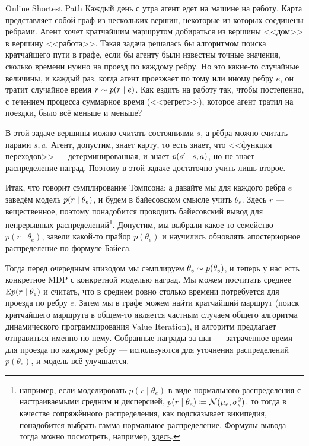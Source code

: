 \begin{exampleBox}[label=ex:onlineshortestpath]{Online Shortest Path}
Каждый день с утра агент едет на машине на работу. Карта представляет собой граф из нескольких вершин, некоторые из которых соединены рёбрами. Агент хочет кратчайшим маршрутом добираться из вершины <<дом>> в вершину <<работа>>. Такая задача решалась бы алгоритмом поиска кратчайшего пути в графе, если бы агенту были известны точные значения, сколько времени нужно на проезд по каждому ребру. Но это какие-то случайные величины, и каждый раз, когда агент проезжает по тому или иному ребру $e$, он тратит случайное время $r \HM \sim p(r \mid e)$. Как ездить на работу так, чтобы постепенно, с течением процесса суммарное время (<<регрет>>), которое агент тратил на поездки, было всё меньше и меньше?

В этой задаче вершины можно считать состояниями $s$, а рёбра можно считать парами $s, a$. Агент, допустим, знает карту, то есть знает, что <<функция переходов>> --- детерминированная, и знает $p(s' \HM \mid s, a)$, но не знает распределение наград. Поэтому в этой задаче достаточно учить лишь второе.

Итак, что говорит сэмплирование Томпсона: а давайте мы для каждого ребра $e$ заведём модель $p(r \HM \mid \theta_e)$, и будем в байесовском смысле учить $\theta_e$. Здесь $r$ --- вещественное, поэтому понадобится проводить байесовский вывод для непрерывных распределений\footnote[*]{например, если моделировать $p(r \mid \theta_e)$ в виде нормального распределения с настраиваемыми средним и дисперсией, $p(r \mid \theta_e) \HM \coloneqq \N(\mu_e, \sigma^2_e)$, то тогда в качестве сопряжённого распределения, как подсказывает  \href{https://en.wikipedia.org/wiki/Conjugate_prior\#When_likelihood_function_is_a_continuous_distribution}{википедия}, понадобится выбрать \href{https://en.wikipedia.org/wiki/Normal-gamma_distribution}{гамма-нормальное распределение}. Формулы вывода тогда можно посмотреть, например, \href{https://en.wikipedia.org/wiki/Normal-gamma_distribution\#Posterior_distribution_of_the_parameters}{здесь}.}. Допустим, мы выбрали какое-то семейство $p(r \mid \theta_e)$, завели какой-то прайор $p(\theta_e)$ и научились обновлять апостериорное распределение по формуле Байеса. 

Тогда перед очередным эпизодом мы сэмплируем $\theta_e \HM\sim p(\theta_e)$, и теперь у нас есть конкретное MDP с конкретной моделью наград. Мы можем посчитать среднее $\mathbb{E} p(r \mid \theta_e)$ и считать, что в среднем ровно столько времени потребуется для проезда по ребру $e$. Затем мы в графе можем найти кратчайший маршрут (поиск кратчайшего маршрута в общем-то является частным случаем общего алгоритма динамического программирования Value Iteration), и алгоритм предлагает отправиться именно по нему. Собранные награды за шаг --- затраченное время для проезда по каждому ребру --- используются для уточнения распределений $p(\theta_e)$, и модель всё улучшается.
\end{exampleBox}